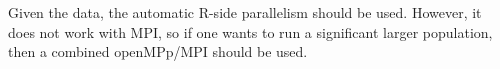 

Given the data, the automatic R-side parallelism should be
used. However, it does not work with MPI, so if one wants to run a
significant larger population, then a combined openMPp/MPI should be
used. 

